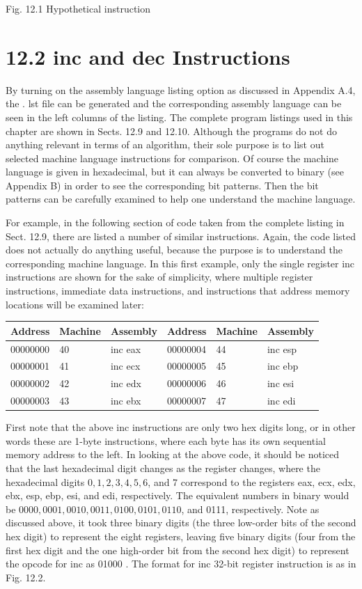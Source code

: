 \documentclass[10pt]{article}
\begin{document}
Fig. 12.1 Hypothetical instruction

\section*{12.2 inc and dec Instructions}
By turning on the assembly language listing option as discussed in Appendix A.4, the . lst file can be generated and the corresponding assembly language can be seen in the left columns of the listing. The complete program listings used in this chapter are shown in Sects. 12.9 and 12.10. Although the programs do not do anything relevant in terms of an algorithm, their sole purpose is to list out selected machine language instructions for comparison. Of course the machine language is given in hexadecimal, but it can always be converted to binary (see Appendix B) in order to see the corresponding bit patterns. Then the bit patterns can be carefully examined to help one understand the machine language.

For example, in the following section of code taken from the complete listing in Sect. 12.9, there are listed a number of similar instructions. Again, the code listed does not actually do anything useful, because the purpose is to understand the corresponding machine language. In this first example, only the single register inc instructions are shown for the sake of simplicity, where multiple register instructions, immediate data instructions, and instructions that address memory locations will be examined later:

\begin{center}
\begin{tabular}{|l|l|l|l|l|l|}
\hline
Address & Machine & Assembly & Address & Machine & Assembly \\
\hline
00000000 & 40 & inc eax & 00000004 & 44 & inc esp \\
\hline
00000001 & 41 & inc ecx & 00000005 & 45 & inc ebp \\
\hline
00000002 & 42 & inc edx & 00000006 & 46 & inc esi \\
\hline
00000003 & 43 & inc ebx & 00000007 & 47 & inc edi \\
\hline
\end{tabular}
\end{center}

First note that the above inc instructions are only two hex digits long, or in other words these are 1-byte instructions, where each byte has its own sequential memory address to the left. In looking at the above code, it should be noticed that the last hexadecimal digit changes as the register changes, where the hexadecimal digits $0,1,2,3,4,5,6$, and 7 correspond to the registers eax, ecx, edx, ebx, esp, ebp, esi, and edi, respectively. The equivalent numbers in binary would be $0000,0001,0010,0011,0100,0101,0110$, and 0111, respectively. Note as discussed above, it took three binary digits (the three low-order bits of the second hex digit) to represent the eight registers, leaving five binary digits (four from the first hex digit and the one high-order bit from the second hex digit) to represent the opcode for inc as 01000 . The format for inc 32-bit register instruction is as in Fig. 12.2.
\end{document}
